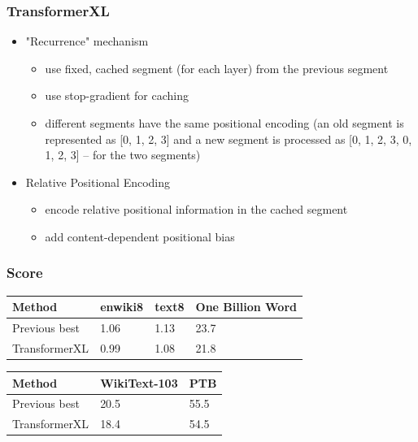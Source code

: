 \documentclass{beamer}
\begin{document}
\begin{frame}
    \frametitle{TransformerXL}
    \begin{itemize}
        \item "Recurrence" mechanism
        \begin{itemize}
            \item use fixed, cached segment (for each layer) from the previous segment
            \item use stop-gradient for caching
            \item different segments have the same positional encoding (an old segment is represented as [0, 1, 2, 3] and a new segment is processed as [0, 1, 2, 3, 0, 1, 2, 3] -- for the two segments)
        \end{itemize}
        \item Relative Positional Encoding
        \begin{itemize}
            \item encode relative positional information in the cached segment
            \item add content-dependent positional bias
        \end{itemize}
    \end{itemize}
\end{frame}

\begin{frame}
    \frametitle{Score}
    \begin{center}
    	\begin{tabular}{l | l | l | l}
    		\textbf{Method} & \textbf{enwiki8} & \textbf{text8} & \textbf{One Billion Word} \\
    		\hline
    		Previous best & 1.06 & 1.13 & 23.7 \\
    		\hline
    		TransformerXL & 0.99 & 1.08 & 21.8 \\
    	\end{tabular}
    	\begin{tabular}{l| l | l}
    	    \textbf{Method} & \textbf{WikiText-103} & \textbf{PTB} \\
    	    \hline
    	    Previous best & 20.5 & 55.5 \\
    		\hline
    	    TransformerXL & 18.4 & 54.5 \\
    	\end{tabular}
    \end{center}
\end{frame}



\end{document}
